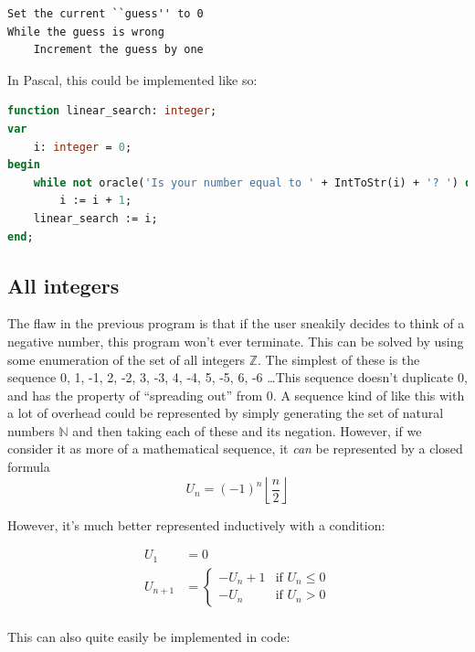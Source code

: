 \documentclass{article}
\begin{document}
\begin{lstlisting}[caption=Linear search on $\mathbb{N}$ pseudocode]
Set the current ``guess'' to 0
While the guess is wrong
    Increment the guess by one
\end{lstlisting}

    In Pascal, this could be implemented like so:

\begin{lstlisting}[language=Pascal, caption=Linear search on $\mathbb{N}$ implementation]
function linear_search: integer;
var
    i: integer = 0;
begin
    while not oracle('Is your number equal to ' + IntToStr(i) + '? ') do
        i := i + 1;
    linear_search := i;
end;
\end{lstlisting}

    \subsection{All integers}
    The flaw in the previous program is that if the user sneakily decides to
    think of a negative number, this program won't ever terminate. This can be
    solved by using some enumeration of the set of all integers $\mathbb{Z}$.
    The simplest of these is the sequence 0, 1, -1, 2, -2, 3, -3, 4, -4, 5, -5,
    6, -6 \ldots This sequence doesn't duplicate 0, and has the property of
    ``spreading out'' from 0. A sequence kind of like this with a lot of
    overhead could be represented by simply generating the set of natural
    numbers $\mathbb{N}$ and then taking each of these and its negation. However,
    if we consider it as more of a mathematical sequence, it \textit{can} be
    represented by a closed formula
    \begin{equation}
    U_n = (-1)^n \left\lfloor \frac{n}{2} \right\rfloor
    \end{equation}

    However, it's much better represented inductively with a condition:

    \begin{align*}
        U_1 &= 0\\
        U_{n + 1} &= 
        \begin{cases}
            -U_n + 1        & \text{if } U_n \leq 0\\
            -U_n            & \text{if } U_n > 0
        \end{cases}\\
    \end{align*}

    This can also quite easily be implemented in code:
\end{document}
